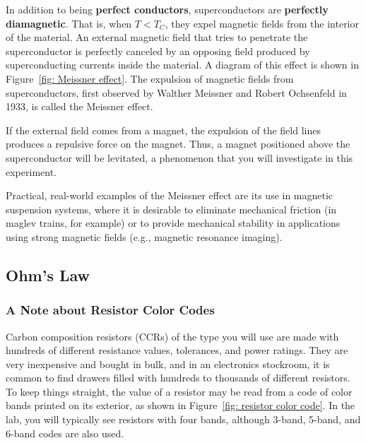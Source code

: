 \documentclass[addpoints]{physlabs}
\begin{document}
\begin{labsection}
\begin{theory}
In addition to being \textbf{perfect conductors}, superconductors are \textbf{perfectly diamagnetic}. That is, when $T<T_C$, they expel magnetic fields from the interior of the material. An external magnetic field that tries to penetrate the superconductor is perfectly canceled by an opposing field produced by superconducting currents inside the material. A diagram of this effect is shown in Figure~\ref{fig: Meissner effect}. The expulsion of magnetic fields from superconductors, first observed by Walther Meissner and Robert Ochsenfeld in 1933, is called the Meissner effect.

If the external field comes from a magnet, the expulsion of the field lines produces a repulsive force on the magnet. Thus, a magnet positioned above the superconductor will be levitated, a phenomenon that you will investigate in this experiment.

Practical, real-world examples of the Meissner effect are its use in magnetic suspension systems, where it is desirable to eliminate mechanical friction (in maglev trains, for example) or to provide mechanical stability in applications using strong magnetic fields (e.g., magnetic resonance imaging).

\end{theory}

\begin{experiment}

\subsection*{Ohm's Law}

\begin{center}
\setlength{\fboxsep}{6pt}%
\setlength{\fboxrule}{2pt}%
\end{center}

\subsubsection*{A Note about Resistor Color Codes}

Carbon composition resistors (CCRs) of the type you will use are made with hundreds of different resistance values, tolerances, and power ratings. They are very inexpensive and bought in bulk, and in an electronics stockroom, it is common to find drawers filled with hundreds to thousands of different resistors. To keep things straight, the value of a resistor may be read from a code of color bands printed on its exterior, as shown in Figure~\ref{fig: resistor color code}. In the lab, you will typically see resistors with four bands, although 3-band, 5-band, and 6-band codes are also used.


\end{experiment}
\end{labsection}
\end{document}
